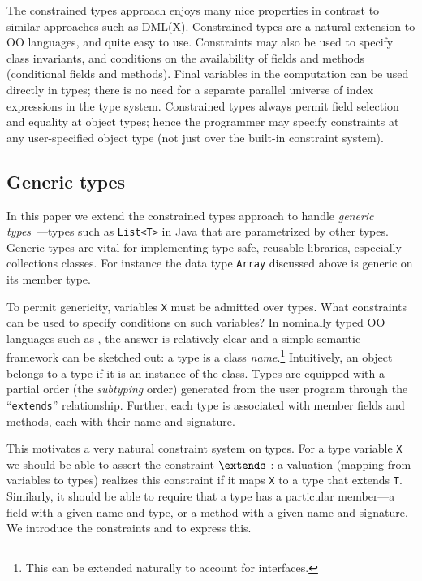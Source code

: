 The constrained types approach enjoys many nice properties in contrast
to similar approaches such as DML(X)\cite{xi99dependent}.  Constrained
types are a natural extension to OO languages, and quite easy to
use. Constraints may also be used to specify class invariants, and
conditions on the availability of fields and methods (conditional
fields and methods).  Final variables in the computation can be used
directly in types; there is no need for a separate parallel universe
of index expressions in the type system.  Constrained types always
permit field selection and equality at object types; hence the
programmer may specify constraints at any user-specified object type
(not just over the built-in constraint system).  


\subsection{Generic types}

In this paper we extend the constrained types approach to handle {\em
generic
types}~\cite{clu,ada,GJ,java-popl97,thorup97,Java3,csharp-generics}---types
such as {\tt List<T>} in Java that are parametrized by other
types. Generic types are vital for implementing type-safe, reusable
libraries, especially collections classes. For instance the data type
{\tt Array} discussed above is generic on its member type.

To permit genericity, variables {\tt X} must be admitted over types.
What constraints can be used to specify conditions on such variables?
In nominally typed OO languages such as \Java, the answer is
relatively clear and a simple semantic framework can be sketched out:
a type is a class {\em name}.\footnote{This can be extended naturally
to account for interfaces.} Intuitively, an object belongs to a type
if it is an instance of the class. Types are equipped with a partial
order (the {\em subtyping} order) generated from the user program
through the ``{\tt extends}'' relationship.  Further, each type is
associated with member fields and methods, each with their
name and signature.
%

This motivates a very natural constraint system on types.  For a type
variable {\tt X} we should be able to assert the constraint 
$\extends$ : a valuation (mapping from variables to types) realizes
this constraint if it maps {\tt X} to a type that extends {\tt T}.
Similarly, it should be able to require that a type has a
particular member---a field with a given name and type, or a method
with a given name and signature. We introduce the constraints 
 and  to express this.

